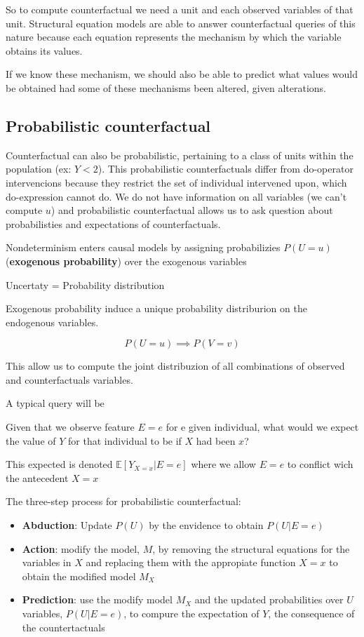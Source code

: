 So to compute counterfactual we need a unit and each observed variables of that unit.
Structural equation models are able to answer counterfactual queries of this nature because
each equation represents the mechanism by which the variable obtains its values.

If we know these mechanism, we should also be able to predict what values would be
obtained had some of these mechanisms been altered, given alterations.

\subsection{Probabilistic counterfactual}
Counterfactual can also be probabilistic, pertaining to a class of units within the population (ex: $Y<2$).
This probabilistic counterfactuals differ from do-operator intervencions because
they restrict the set of individual intervened upon, which do-expression cannot do.
We do not have information on all variables (we can't compute $u$) and probabilistic counterfactual allows
us to ask question about probabilisties and expectations of counterfactuals.

Nondeterminism enters causal models by assigning probabilizies $P(U=u)$ (\textbf{exogenous probability}) over the
exogenous variables
\begin{center}
    Uncertaty = Probability distribution
\end{center}

Exogenous probability induce a unique probability distriburion on the endogenous
variables.

$$P(U=u) \implies P(V=v)$$

This allow us to compute the joint distribuzion of all combinations of
observed and counterfactuals variables.

A typical query will be
\begin{center}
    Given that we observe feature $E=e$ for e given individual, what would we
    expect the value of $Y$ for that individual to be if $X$ had been $x$?
\end{center}

This expected is denoted $\mathbb{E}[Y_{X=x}|E=e]$
where we allow $E=e$ to conflict wich the antecedent $X=x$

The three-step process for probabilistic counterfactual:
\begin{itemize}
    \item \textbf{Abduction}: Update $P(U)$ by the envidence to obtain $P(U |E=e)$
    \item \textbf{Action}: modify the model, $M$, by removing the structural equations for
          the variables in $X$ and replacing them with the appropiate function $X=x$ to
          obtain the modified model $M_X$
    \item \textbf{Prediction}: use the modify model $M_X$ and the updated probabilities
          over $U$ variables, $P(U|E=e)$, to compure the expectation of $Y$, the consequence
          of the countertactuals
\end{itemize}
